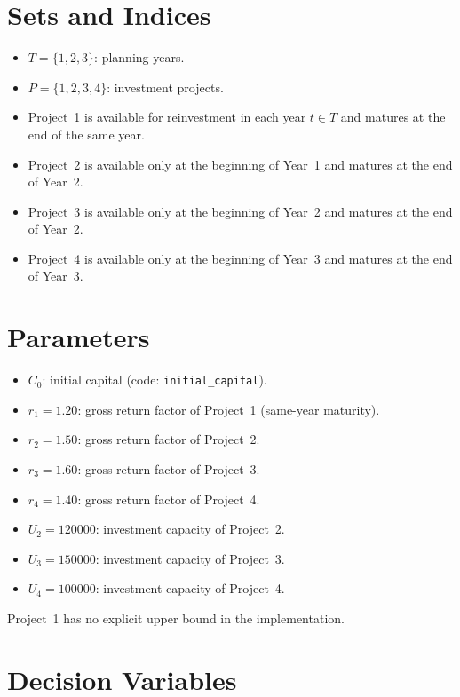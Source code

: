 \section*{Sets and Indices}

\begin{itemize}
    \item $T=\{1,2,3\}$: planning years.
    \item $P=\{1,2,3,4\}$: investment projects.
    \item Project~1 is available for reinvestment in each year $t\in T$ and matures at the end of the same year.
    \item Project~2 is available only at the beginning of Year~1 and matures at the end of Year~2.
    \item Project~3 is available only at the beginning of Year~2 and matures at the end of Year~2.
    \item Project~4 is available only at the beginning of Year~3 and matures at the end of Year~3.
\end{itemize}

\section*{Parameters}

\begin{itemize}
    \item $C_0$: initial capital (code: \texttt{initial\_capital}).
    \item $r_1=1.20$: gross return factor of Project~1 (same-year maturity).
    \item $r_2=1.50$: gross return factor of Project~2.
    \item $r_3=1.60$: gross return factor of Project~3.
    \item $r_4=1.40$: gross return factor of Project~4.
    \item $U_2=120000$: investment capacity of Project~2.
    \item $U_3=150000$: investment capacity of Project~3.
    \item $U_4=100000$: investment capacity of Project~4.
\end{itemize}

Project~1 has no explicit upper bound in the implementation.

\section*{Decision Variables}

